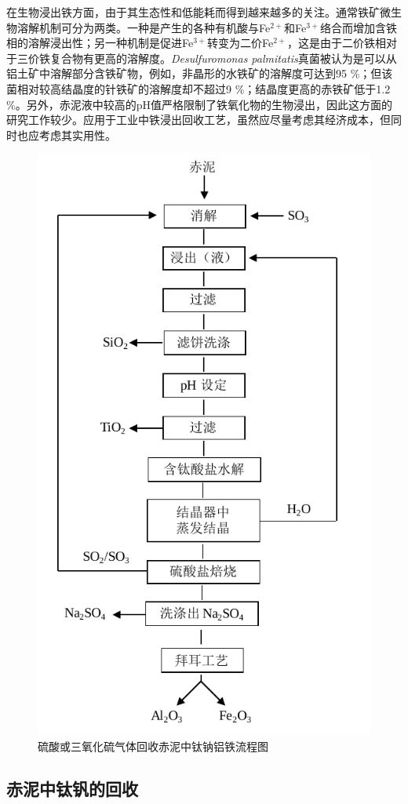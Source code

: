在生物浸出铁方面，由于其生态性和低能耗而得到越来越多的关注\cite{laguna2011bioreduction,qu2013bioleaching,eisele2014review}。通常铁矿微生物溶解机制可分为两类。一种是产生的各种有机酸与Fe$ ^{\mathrm{2+}} $和Fe$ ^{\mathrm{3+}} $络合而增加含铁相的溶解浸出性；另一种机制是促进Fe$ ^{\mathrm{3+}} $转变为二价Fe$ ^{\mathrm{2+}} $，这是由于二价铁相对于三价铁复合物有更高的溶解度\cite{eisele2014review}。\textit{Desulfuromonas palmitatis}真菌被认为是可以从铝土矿中溶解部分含铁矿物，例如，非晶形的水铁矿的溶解度可达到95 \%；但该菌相对较高结晶度的针铁矿的溶解度却不超过9 \%；结晶度更高的赤铁矿低于1.2 \%。另外，赤泥液中较高的pH值严格限制了铁氧化物的生物浸出，因此这方面的研究工作较少\cite{papassiopi2010effectiveness}。应用于工业中铁浸出回收工艺，虽然应尽量考虑其经济成本，但同时也应考虑其实用性。
\begin{figure}[!h]
	\centering
	\includegraphics[width=0.65\linewidth]{Figures/c1/Figure8}
	\caption{硫酸或三氧化硫气体回收赤泥中钛钠铝铁流程图}\label{H2SO4orSO3recoveringFe,Na,Al}
\end{figure}

\subsection{赤泥中钛钒的回收}

